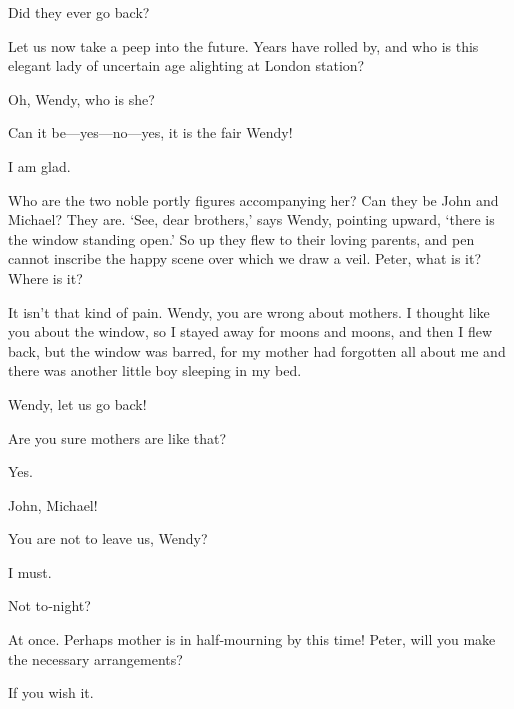 \begin{drama}
\firsttwinspeaks
Did they ever go back?

Let us now take a peep into the future.
Years have rolled by, and who is this elegant lady of uncertain age alighting at London station?


\nibsspeaks
Oh, Wendy, who is she?

Can it be—yes—no—yes, it is the fair Wendy!

\tootlesspeaks
I am glad.

\wendyspeaks
Who are the two noble portly figures accompanying her?
Can they be John and Michael?
They are.
‘See, dear brothers,’ says Wendy, pointing upward, ‘there is the window standing open.’
So up they flew to their loving parents, and pen cannot inscribe the happy scene over which we draw a veil.
Peter, what is it?
Where is it?

\peterspeaks
It isn’t that kind of pain.
Wendy, you are wrong about mothers.
I thought like you about the window, so I stayed away for moons and moons,
and then I flew back, but the window was barred,
for my mother had forgotten all about me and there was another little boy sleeping in my bed.


\johnspeaks
Wendy, let us go back!

\wendyspeaks
Are you sure mothers are like that?

\peterspeaks
Yes.

\wendyspeaks
John, Michael!

You are not to leave us, Wendy?

\wendyspeaks
I must.

\nibsspeaks
Not to‐night?

\wendyspeaks
At once.
Perhaps mother is in half‐mourning by this time!
Peter, will you make the necessary arrangements?


If you wish it.



\end{drama}
